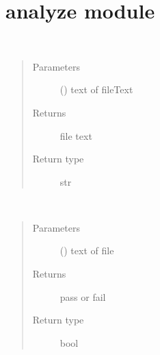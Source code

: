 \documentclass[letterpaper,10pt,english]{sphinxmanual}
\begin{document}
\chapter{analyze module}
\label{\detokenize{analyze::doc}}\label{\detokenize{analyze:analyze-module}}\label{\detokenize{analyze:module-analyze}}

\begin{fulllineitems}
\label{\detokenize{analyze:analyze.analyzeText}}~\begin{quote}\begin{description}
\item[{Parameters}] \leavevmode
{} () \textendash{} text of fileText

\item[{Returns}] \leavevmode
file text

\item[{Return type}] \leavevmode
str

\end{description}\end{quote}

\end{fulllineitems}


\begin{fulllineitems}
\label{\detokenize{analyze:analyze.checkSimilarity}}~\begin{quote}\begin{description}
\item[{Parameters}] \leavevmode
{} () \textendash{} text of file

\item[{Returns}] \leavevmode
pass or fail

\item[{Return type}] \leavevmode
bool

\end{description}\end{quote}

\end{fulllineitems}

\end{document}
